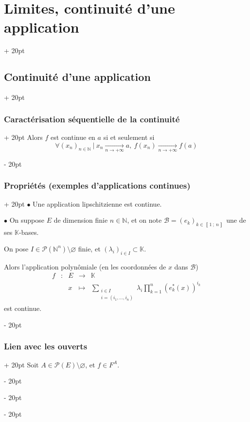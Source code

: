 \documentclass[a4paper, 12pt, twoside]{article}
\newcommand{\N}{\mathbb{N}} %
\newcommand{\K}{\mathbb K}
\newcommand{\nset}[2]{\left\llbracket #1\ ;\ #2 \right\rrbracket}
\newcommand{\tendsto}[1]{\xrightarrow[#1]{}}
\newcommand{\lr}[1]{\left( #1 \right)}
\newcommand{\ind}[1][20pt]{\advance\leftskip + #1}
\newcommand{\deind}[1][20pt]{\advance\leftskip - #1}
\newenvironment{indt}[2][20pt]{#2 \par \ind[#1]}{\par \deind} %
\begin{document}
\begin{indt}{\section{Limites, continuité d'une application}}
\begin{indt}{\subsection{Continuité d'une application}}
\begin{indt}{\subsubsection{Caractérisation séquentielle de la continuité}}
                Alors $f$ est continue en $a$ si et seulement si
                \[
                    \forall \lr{x_n}_{n \in \N}\ |\ x_n \tendsto{n \to +\infty} a,\
                    f(x_n) \tendsto{n \to +\infty} f(a)
                \]
            \end{indt}

            \vspace{12pt}
            
            \begin{indt}{\subsubsection{Propriétés (exemples d'applications continues)}}
                $\bullet$ Une application lipschitzienne est continue.

                \vspace{12pt}
                
                $\bullet$ On suppose $E$ de dimension finie $n \in \N$, et on note $\mathcal B = \lr{e_k}_{k \in \nset 1 n}$ une de ses $\K$-bases.

                On pose $I \in \mathcal P(\N^n) \setminus \varnothing$ finie, et $\lr{\lambda_i}_{i \in I} \subset \K$.

                \vspace{6pt}
                
                Alors l'application polynômiale (en les coordonnées de $x$ dans $\mathcal B$)
                \[
                    \begin{array}{ccccl}
                        f & : & E & \longrightarrow & \K
                        \\
                          && x & \longmapsto &
                          \displaystyle
                          \sum_{\substack{i \in I \\ i = (i_1, \ldots, i_n)}} \lambda_i \prod_{k = 1}^n \lr{e_k^*(x)}^{i_k}
                    \end{array}
                \]
                est continue.
            \end{indt}

            \vspace{12pt}
            
            \begin{indt}{\subsubsection{Lien avec les ouverts}}
                Soit $A \in \mathcal P(E) \setminus \varnothing$, et $f \in F^A$.


\end{indt}
\end{indt}
\end{indt}
\end{document}
